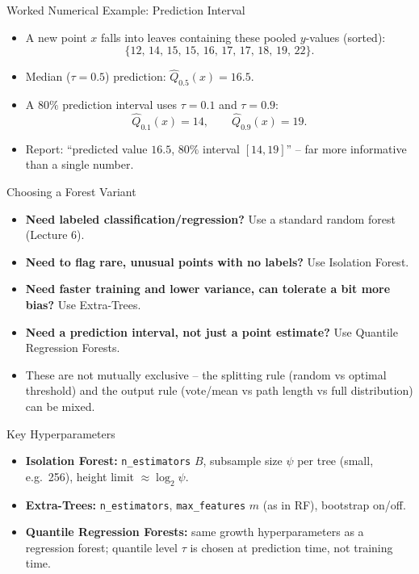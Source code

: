 \begin{frame}{Worked Numerical Example: Prediction Interval}
\small
\begin{itemize}
  \item A new point $x$ falls into leaves containing these pooled $y$-values (sorted):
  \[
    \{12,\,14,\,15,\,15,\,16,\,17,\,17,\,18,\,19,\,22\}.
  \]
  \pause
  \item Median ($\tau=0.5$) prediction: $\hat{Q}_{0.5}(x) = 16.5$.
  \pause
  \item A $80\%$ prediction interval uses $\tau=0.1$ and $\tau=0.9$:
  \[
    \hat{Q}_{0.1}(x) = 14,\qquad \hat{Q}_{0.9}(x) = 19.
  \]
  \pause
  \item Report: ``predicted value $16.5$, $80\%$ interval $[14, 19]$'' -- far more informative than a single number.
\end{itemize}
\end{frame}

\begin{frame}{Choosing a Forest Variant}
\begin{itemize}
  \item \textbf{Need labeled classification/regression?} Use a standard random forest (Lecture 6).
  \pause
  \item \textbf{Need to flag rare, unusual points with no labels?} Use Isolation Forest.
  \pause
  \item \textbf{Need faster training and lower variance, can tolerate a bit more bias?} Use Extra-Trees.
  \pause
  \item \textbf{Need a prediction interval, not just a point estimate?} Use Quantile Regression Forests.
  \pause
  \item These are not mutually exclusive -- the splitting rule (random vs optimal threshold) and the output rule (vote/mean vs path length vs full distribution) can be mixed.
\end{itemize}
\end{frame}

\begin{frame}{Key Hyperparameters}
\begin{itemize}
  \item \textbf{Isolation Forest:} \texttt{n\_estimators} $B$, subsample size $\psi$ per tree (small, e.g.\ 256), height limit $\approx \log_2 \psi$.
  \pause
  \item \textbf{Extra-Trees:} \texttt{n\_estimators}, \texttt{max\_features} $m$ (as in RF), bootstrap on/off.
  \pause
  \item \textbf{Quantile Regression Forests:} same growth hyperparameters as a regression forest; quantile level $\tau$ is chosen at prediction time, not training time.
\end{itemize}
\end{frame}


